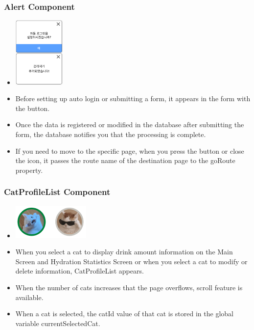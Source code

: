 \documentclass[conference]{IEEEtran}
\begin{document}
\subsubsection{Alert Component}
\begin{itemize}
    \item[] \includegraphics[width=0.2\textwidth]{img/C/4.png}
    \item Before setting up auto login or submitting a form, it appears in the form with the button.
    \item Once the data is registered or modified in the database after submitting the form, the database notifies you that the processing is complete.
    \item If you need to move to the specific page, when you press the button or close the icon, it passes the route name of the destination page to the goRoute property. \\
\end{itemize}

\subsubsection{CatProfileList Component}
\begin{itemize}
    \item[] \includegraphics[width=0.3\textwidth]{img/C/5.png}
    \item When you select a cat to display drink amount information on the Main Screen and Hydration Statistics Screen or when you select a cat to modify or delete information, CatProfileList appears.
    \item When the number of cats increases that the page overflows, scroll feature is available.
    \item When a cat is selected, the catId value of that cat is stored in the global variable currentSelectedCat. \\
\end{itemize}
\newpage
\end{document}
